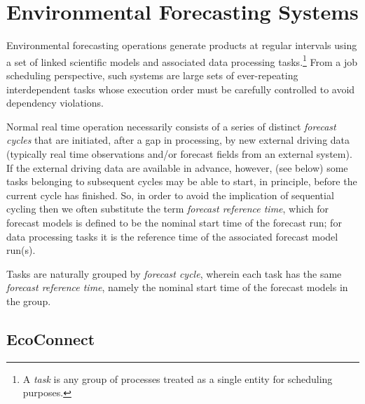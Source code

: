 \documentclass[11pt,a4paper]{article}
\begin{document}
\section{Environmental Forecasting Systems}
\label{sec:EFS}

Environmental forecasting operations generate products at regular
intervals using a set of linked scientific models and associated data
processing tasks.\footnote{A {\em task} is any group of processes
treated as a single entity for scheduling purposes.}  From a job
scheduling perspective, such systems are large sets of ever-repeating
interdependent tasks whose execution order must be carefully controlled
to avoid dependency violations.  

Normal real time operation necessarily consists of a series of distinct
{\em forecast cycles} that are initiated, after a gap in processing, by
new external driving data (typically real time observations and/or
forecast fields from an external system). If the external driving data
are available in advance, however, (see below) some tasks belonging to
subsequent cycles may be able to start, in principle, before the current
cycle has finished.  So, in order to avoid the implication of sequential
cycling then we often substitute the term {\em forecast reference time},
which for forecast models is defined to be the nominal start time of the
forecast run; for data processing tasks it is the reference time of the
associated forecast model run(s). 

Tasks are naturally grouped by {\em forecast cycle}, wherein
each task has the same {\em forecast reference time}, namely the nominal
start time of the forecast models in the group. 



\subsection{EcoConnect}
\end{document}
